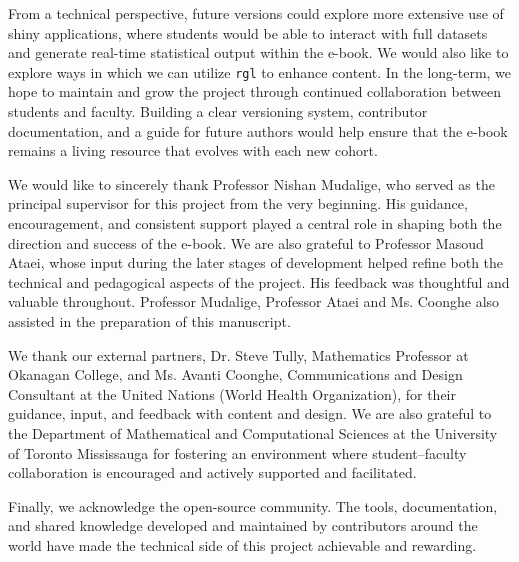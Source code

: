 \documentclass[11pt]{article}
\begin{document}
From a technical perspective, future versions could explore more extensive use of shiny applications, where students would be able to interact with full datasets and generate real-time statistical output within the e-book. 
We would also like to explore ways in which we can utilize \texttt{rgl} to enhance content.
In the long-term, we hope to maintain and grow the project through continued collaboration between students and faculty. Building a clear versioning system, contributor documentation, and a guide for future authors would help ensure that the e-book remains a living resource that evolves with each new cohort.


\begin{acknowledgments}
We would like to sincerely thank Professor Nishan Mudalige, who served as the principal supervisor for this project from the very beginning. His guidance, encouragement, and consistent support played a central role in shaping both the direction and success of the e-book.
We are also grateful to Professor Masoud Ataei, whose input during the later stages of development helped refine both the technical and pedagogical aspects of the project. His feedback was thoughtful and valuable throughout.
Professor Mudalige, Professor Ataei and Ms. Coonghe also assisted in the preparation of this manuscript.

We thank our external partners, Dr. Steve Tully, Mathematics Professor at Okanagan College, and Ms. Avanti Coonghe, Communications and Design Consultant at the United Nations (World Health Organization), for their guidance, input, and feedback with content and design.
We are also grateful to the Department of Mathematical and Computational Sciences at the University of Toronto Mississauga for fostering an environment where student–faculty collaboration is encouraged and actively supported and facilitated.

Finally, we acknowledge the open-source community. The tools, documentation, and shared knowledge developed and maintained by contributors around the world have made the technical side of this project achievable and rewarding.
\end{acknowledgments}

\printbibliography[title={REFERENCES},heading=bibintoc]
\end{document}

